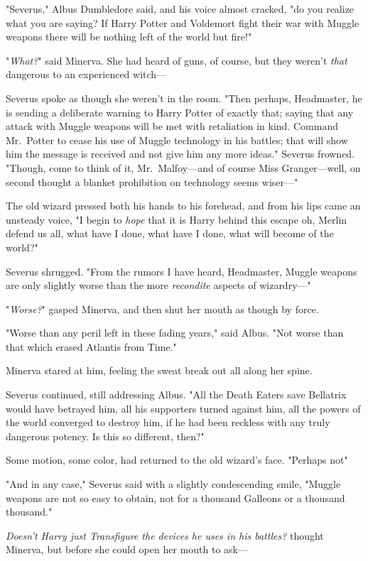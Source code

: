 "Severus," Albus Dumbledore said, and his voice almost cracked, "do you realize
what you are saying? If Harry Potter and Voldemort fight their war with Muggle
weapons there will be nothing left of the world but fire!"

"\emph{What?}" said Minerva. She had heard of guns, of course, but they weren't
\emph{that} dangerous to an experienced witch---

Severus spoke as though she weren't in the room. "Then perhaps, Headmaster, he
is sending a deliberate warning to Harry Potter of exactly that; saying that
any attack with Muggle weapons will be met with retaliation in kind. Command
Mr.~Potter to cease his use of Muggle technology in his battles; that will show
him the message is received{\el} and not give him any more ideas." Severus
frowned. "Though, come to think of it, Mr.~Malfoy---and of course Miss
Granger---well, on second thought a blanket prohibition on technology seems
wiser---"

The old wizard pressed both his hands to his forehead, and from his lips came
an unsteady voice, "I begin to \emph{hope} that it is Harry behind this
escape{\el} oh, Merlin defend us all, what have I done, what have I done,
what will become of the world?"

Severus shrugged. "From the rumors I have heard, Headmaster, Muggle weapons are
only slightly worse than the more{\el} \emph{recondite} aspects of
wizardry---"

"\emph{Worse?}" gasped Minerva, and then shut her mouth as though by force.

"Worse than any peril left in these fading years," said Albus. "Not worse than
that which erased Atlantis from Time."

Minerva stared at him, feeling the sweat break out all along her spine.

Severus continued, still addressing Albus. "All the Death Eaters save Bellatrix
would have betrayed him, all his supporters turned against him, all the powers
of the world converged to destroy him, if he had been reckless with any truly
dangerous potency. Is this so different, then?"

Some motion, some color, had returned to the old wizard's face. "Perhaps
not{\el}"

"And in any case," Severus said with a slightly condescending smile, "Muggle
weapons are not so easy to obtain, not for a thousand Galleons or a thousand
thousand."

\emph{Doesn't Harry just Transfigure the devices he uses in his battles?}
thought Minerva, but before she could open her mouth to ask---

